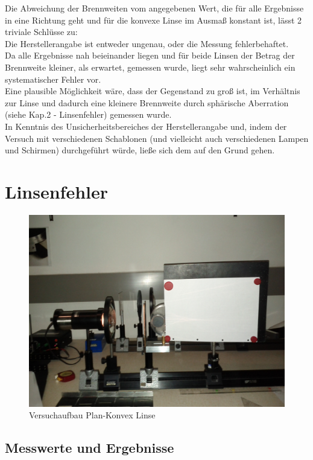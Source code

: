 \documentclass[12pt,a4paper]{article}
\begin{document}
\begin{multicols}{2}
Die Abweichung der Brennweiten vom angegebenen Wert, die für alle Ergebnisse in eine Richtung geht und für die konvexe Linse im Ausmaß konstant ist, lässt 2 triviale Schlüsse zu: \\
Die Herstellerangabe ist entweder ungenau, oder die Messung fehlerbehaftet.\\
Da alle Ergebnisse nah beieinander liegen und für beide Linsen der Betrag der Brennweite kleiner, als erwartet, gemessen wurde, liegt sehr wahrscheinlich ein systematischer Fehler vor. \\
Eine plausible Möglichkeit wäre, dass der Gegenstand zu groß ist, im Verhältnis zur Linse und dadurch eine kleinere Brennweite durch sphärische Aberration (siehe Kap.2 - Linsenfehler) gemessen wurde.\\
In Kenntnis des Unsicherheitsbereiches der Herstellerangabe und, indem der Versuch mit verschiedenen Schablonen (und vielleicht auch verschiedenen Lampen und Schirmen) durchgeführt würde, ließe sich dem auf den Grund gehen.


\section{Linsenfehler}
\begin{figure}[H]
	\centering
	\includegraphics[scale=0.08]{./figure/linsenfehler.jpg}
	\caption{Versuchaufbau Plan-Konvex Linse}
	\label{fig:linsenfehler_aufbau}
\end{figure}
\subsection{Messwerte und Ergebnisse}

\end{multicols}
\end{document}
